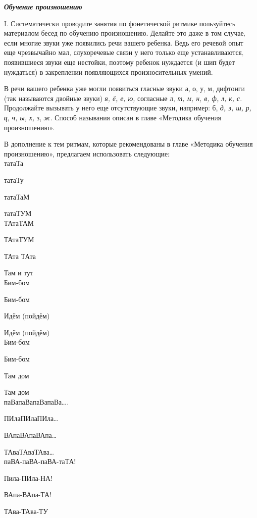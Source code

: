 \documentclass[a5paper]{book}
\renewcommand{\emph}[1]{\textit{#1}}
\begin{document}
\emph{\textbf{Обучение произношению}}

I. Систематически проводите занятия по фонетической ритмике пользуйтесь
материалом бесед по обучению произношению. Делайте это даже в том
случае, если многие звуки уже появились речи вашего ребенка. Ведь его
речевой опыт еще чрезвычайно мал, слухоречевые связи у него только еще
устанавливаются, появившиеся звуки еще нестойки, поэтому ребенок
нуждается (и шип будет нуждаться) в закреплении появляющихся
произносительных умений.

В речи вашего ребенка уже могли появиться гласные звуки а, о, у, м,
дифтонги (так называются двойные звуки) \emph{я, ё, е, ю,} согласные л,
\emph{т, м, н, в, ф, л, к, с.} Продолжайте вызывать у него еще
отсутствующие звуки, например: б, \emph{д, э, ш, р, ц, ч, ы, х,} з,
\emph{ж.} Способ называния описан в главе «Методика обучения
произношению».

В дополнение к тем ритмам, которые рекомендованы в главе «Методика
обучения произношению», предлагаем использовать следующие: \\


татаТа

татаТу

татаТаМ

татаТУМ \\

ТАтаТАМ

ТАтаТУМ

ТАта ТАта

Там и тут \\

Бим-бом

Бим-бом

Идём (пойдём)

Идём (пойдём) \\

Бим-бом

Бим-бом

Там дом

Там дом \\

паВапаВапаВапаВа\ldots.

ПИлаПИлаПИла\ldots{}

ВАпаВАпаВАпа\ldots{}

ТАваТАваТАва\ldots{} \\

паВА-паВА-паВА-таТА!

Пила-ПИла-НА!

ВАпа-ВАпа-ТА!

ТАва-ТАва-ТУ \\
\end{document}
